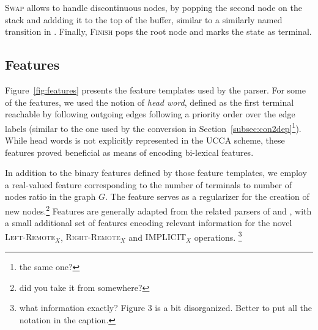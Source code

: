 \documentclass[11pt]{article}
\newcommand{\oa}[1]{\footnote{\color{red} #1}}
\newcommand{\secref}[1]{Section~\ref{#1}}
\newcommand{\figref}[1]{Figure~\ref{#1}}
\begin{document}
\textsc{Swap} allows to handle discontinuous nodes, by popping the second
node on the stack and addding it to the top of the buffer, similar to a
similarly named transition in \cite{maier2015discontinuous}.
Finally, \textsc{Finish} pops the root node and marks the state as terminal.

\subsection{Features}
\label{subsec:features}

\figref{fig:features} presents the feature templates used by the parser.
For some of the features, we used the notion of \textit{head word}, defined 
as the first terminal reachable by following outgoing edges following a priority order
over the edge labels (similar to the one used by the conversion in \secref{subsec:con2dep}\oa{the same one?}).
While head words is not explicitly represented in the UCCA scheme, these
features proved beneficial as means of encoding bi-lexical features.

In addition to the binary features defined by those feature templates,
we employ a real-valued feature corresponding to the number of terminals to number of nodes
ratio in the graph $G$. The feature serves as a regularizer for the creation of new nodes.\oa{did you take it
  from somewhere?}
Features are generally adapted from the related parsers of  and
, with a small additional set of features encoding relevant information
for the novel \textsc{Left-Remote$_X$}, \textsc{Right-Remote$_X$} and \textsc{IMPLICIT$_X$} operations.
\oa{what information exactly? Figure 3 is a bit disorganized. Better to put all the notation in the caption.}

\end{document}
